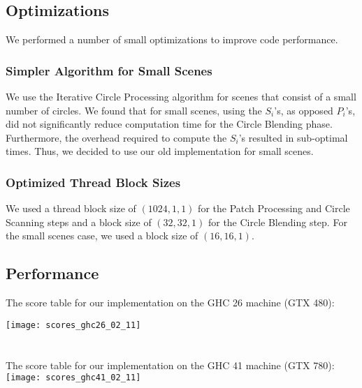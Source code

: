\documentclass{article}
\begin{document}
\subsection{Optimizations}
\label{sec:optimizations}
We performed a number of small optimizations to improve code performance. 

\subsubsection{Simpler Algorithm for Small Scenes}
We use the Iterative Circle Processing algorithm for scenes that consist of a small number of circles. We found that for small scenes, using the $S_i$'s, as opposed $P_i$'s, did not significantly reduce computation time for the Circle Blending phase. Furthermore, the overhead required to compute the $S_i$'s resulted in sub-optimal times. Thus, we decided to use our old implementation for small scenes. 

\subsubsection{Optimized Thread Block Sizes}
We used a thread block size of $(1024,1,1)$ for the Patch Processing and Circle Scanning steps and a block size of $(32,32,1)$ for the Circle Blending step. For the small scenes case, we used a block size of $(16,16,1)$. 

\subsection{Performance}
The score table for our implementation on the GHC 26 machine (GTX 480):

\texttt{[image: scores\_ghc26\_02\_11]}\\\\\\
The score table for our implementation on the GHC 41 machine (GTX 780):\\

\texttt{[image: scores\_ghc41\_02\_11]}
\end{document}
